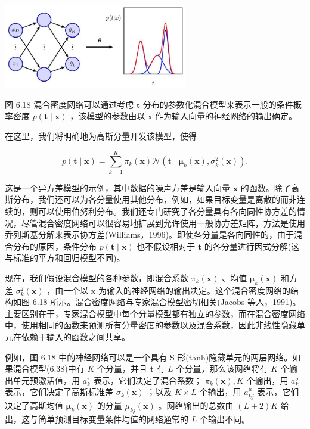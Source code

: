\documentclass[10pt]{report}
\begin{document}
\begin{center}
\includegraphics[max width=0.6\textwidth]{images/0194e279-9b28-703a-88f4-c3ac21e2010d_219_722_356_823_379_0.jpg}
\end{center}
\hspace*{3em} 

图 6.18 混合密度网络可以通过考虑 \(\mathbf{t}\) 分布的参数化混合模型来表示一般的条件概率密度 \(p\left( {\mathbf{t} \mid  \mathbf{x}}\right)\) ，该模型的参数由以 \(\mathrm{x}\) 作为输入向量的神经网络的输出确定。

在这里，我们将明确地为高斯分量开发该模型，使得

\[
p\left( {\mathbf{t} \mid  \mathbf{x}}\right)  = \mathop{\sum }\limits_{{k = 1}}^{K}{\pi }_{k}\left( \mathbf{x}\right) \mathcal{N}\left( {\mathbf{t} \mid  {\mathbf{\mu }}_{k}\left( \mathbf{x}\right) ,{\sigma }_{k}^{2}\left( \mathbf{x}\right) }\right) . \tag{6.38}
\]

这是一个异方差模型的示例，其中数据的噪声方差是输入向量 \(\mathbf{x}\) 的函数。除了高斯分布，我们还可以为各分量使用其他分布，例如，如果目标变量是离散的而非连续的，则可以使用伯努利分布。我们还专门研究了各分量具有各向同性协方差的情况，尽管混合密度网络可以很容易地扩展到允许使用一般协方差矩阵，方法是使用乔列斯基分解来表示协方差(Williams，1996)。即使各分量是各向同性的，由于混合分布的原因，条件分布 \(p\left( {\mathbf{t} \mid  \mathbf{x}}\right)\) 也不假设相对于 \(\mathbf{t}\) 的各分量进行因式分解(这与标准的平方和回归模型不同)。

现在，我们假设混合模型的各种参数，即混合系数 \({\pi }_{k}\left( \mathbf{x}\right)\) 、均值 \({\mathbf{\mu }}_{k}\left( \mathbf{x}\right)\) 和方差 \({\sigma }_{k}^{2}\left( \mathbf{x}\right)\) ，由一个以 \(\mathrm{x}\) 为输入的神经网络的输出决定。这个混合密度网络的结构如图 6.18 所示。混合密度网络与专家混合模型密切相关(Jacobs 等人，1991)。主要区别在于，专家混合模型中每个分量模型都有独立的参数，而在混合密度网络中，使用相同的函数来预测所有分量密度的参数以及混合系数，因此非线性隐藏单元在依赖于输入的函数之间共享。

例如，图 6.18 中的神经网络可以是一个具有 S 形(tanh)隐藏单元的两层网络。如果混合模型(6.38)中有 \(K\) 个分量，并且 \(\mathbf{t}\) 有 \(L\) 个分量，那么该网络将有 \(K\) 个输出单元预激活值，用 \({a}_{k}^{\pi }\) 表示，它们决定了混合系数； \({\pi }_{k}\left( \mathbf{x}\right) ,K\) 个输出，用 \({a}_{k}^{\sigma }\) 表示，它们决定了高斯标准差 \({\sigma }_{k}\left( \mathbf{x}\right)\) ；以及 \(K \times  L\) 个输出，用 \({a}_{kj}^{\mu }\) 表示，它们决定了高斯均值 \({\mathbf{\mu }}_{k}\left( \mathbf{x}\right)\) 的分量 \({\mu }_{kj}\left( \mathbf{x}\right)\) 。网络输出的总数由 \(\left( {L + 2}\right) K\) 给出，这与简单预测目标变量条件均值的网络通常的 \(L\) 个输出不同。
\end{document}
